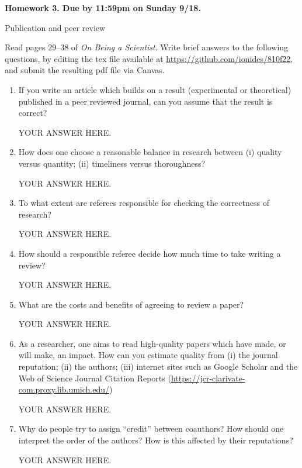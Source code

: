 \documentclass[12pt]{article}
\begin{document}
\begin{center}\bf
Homework 3. Due by 11:59pm on Sunday 9/18.

Publication and peer review

\end{center}

Read pages 29--38 of {\em On Being a Scientist}. Write brief answers to the following questions, by editing the tex file available at \url{https://github.com/ionides/810f22}, and submit the resulting pdf file via Canvas. 

\begin{enumerate}
\item If you write an article which builds on a result (experimental or theoretical) published in a peer reviewed journal, can you assume that the result is correct?

YOUR ANSWER HERE.

\item How does one choose a reasonable balance in research between (i) quality versus quantity; (ii) timeliness versus thoroughness?

YOUR ANSWER HERE.

\item To what extent are referees responsible for checking the correctness of research? 

YOUR ANSWER HERE.

\item How should a responsible referee decide how much time to take writing a review? 

YOUR ANSWER HERE.

\item What are the costs and benefits of agreeing to review a paper?

YOUR ANSWER HERE.

\item As a researcher, one aims to read high-quality papers which have made, or will make, an impact. How can you estimate quality from (i) the journal reputation; (ii) the authors; (iii) internet sites such as Google Scholar and the Web of Science Journal Citation Reports (\url{https://jcr-clarivate-com.proxy.lib.umich.edu/})  

YOUR ANSWER HERE.

\item Why do people try to assign ``credit'' between coauthors? How should one interpret the order of the authors? How is this affected by their reputations? 

YOUR ANSWER HERE.


\end{enumerate}
\end{document}
